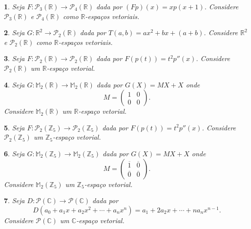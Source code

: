 \documentclass[12pt]{exam}
\newtheorem{exercicio}{}
\newcommand{\z}{\mathbb{Z}}
\newcommand{\real}{\mathbb{R}}
\newcommand{\complex}{\mathbb{C}}
\newcommand{\cp}[1]{\mathbb{#1}}
\begin{document}
\begin{exercicio}
Seja $F : \mathcal{P}_3(\real) \to \mathcal{P}_4(\real)$ dada por $(Fp)(x) = xp(x + 1)$. Considere $\mathcal{P}_3(\real)$ e $\mathcal{P}_4(\real)$ como $\real$-espa\c{c}os vetoriais.
\end{exercicio}

\begin{exercicio}
  Seja $G : \real^2 \to \mathcal{P}_2(\real)$ dada por $T(a,b) = ax^2 + bx + (a + b)$. Considere $\real^2$ e $\mathcal{P}_2(\real)$ como $\real$-espa\c{c}os vetoriais.
\end{exercicio}

\begin{exercicio}
  Seja $F : \mathcal{P}_2(\real) \to \mathcal{P}_2(\real)$ dada por $F(p(t)) = t^2p''(x)$. Considere $\mathcal{P}_2(\real)$ um $\real$-espa\c{c}o vetorial.
\end{exercicio}

\begin{exercicio}
  Seja $G : \cp{M}_2(\real) \to \cp{M}_2(\real)$ dada por $G(X) = MX + X$ onde
    \[
      M = \begin{pmatrix}
        1 & 0\\
        0 & 0
      \end{pmatrix}.
    \]
    Considere $\cp{M}_2(\real)$ um $\real$-espa\c{c}o vetorial.
\end{exercicio}


\begin{exercicio}
  Seja $F : \mathcal{P}_2(\z_5) \to \mathcal{P}_2(\z_5)$ dada por $F(p(t)) = t^2p''(x)$. Considere $\mathcal{P}_2(\z_5)$ um $\z_5$-espa\c{c}o vetorial.
\end{exercicio}

\begin{exercicio}
  Seja $G : \cp{M}_2(\z_5) \to \cp{M}_2(\z_5)$ dada por $G(X) = MX + X$ onde
    \[
      M = \begin{pmatrix}
        \overline{1} & \overline{0}\\
        \overline{0} & \overline{0}
      \end{pmatrix}.
    \]
    Considere $\cp{M}_2(\z_5)$ um $\z_5$-espa\c{c}o vetorial.
\end{exercicio}

\begin{exercicio}
  Seja $D : \mathcal{P}(\complex) \to \mathcal{P}(\complex)$ dada por
    \[
      D(a_0 + a_1x + a_2x^2 + \cdots + a_nx^n) = a_1 + 2a_2x + \cdots + na_nx^{n - 1}.
    \]
  Considere $\mathcal{P}(\complex)$ um $\complex$-espa\c{c}o vetorial.
\end{exercicio}
\end{document}
